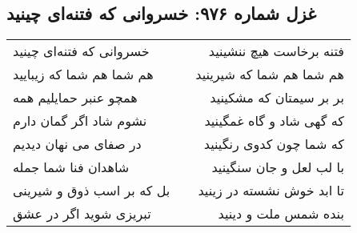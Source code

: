 \begin{center}
\section*{غزل شماره ۹۷۶: خسروانی که فتنه‌ای چینید}
\label{sec:0976}
\begin{longtable}{l p{0.5cm} r}
خسروانی که فتنه‌ای چینید
&&
فتنه برخاست هیچ ننشینید
\\
هم شما هم شما که زیبایید
&&
هم شما هم شما که شیرینید
\\
همچو عنبر حمایلیم همه
&&
بر بر سیمتان که مشکینید
\\
نشوم شاد اگر گمان دارم
&&
که گهی شاد و گاه غمگینید
\\
در صفای می نهان دیدیم
&&
که شما چون کدوی رنگینید
\\
شاهدان فنا شما جمله
&&
با لب لعل و جان سنگینید
\\
بل که بر اسب ذوق و شیرینی
&&
تا ابد خوش نشسته در زینید
\\
تبریزی شوید اگر در عشق
&&
بنده شمس ملت و دینید
\\
\end{longtable}
\end{center}
